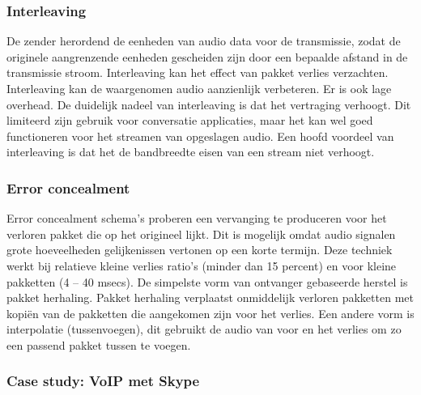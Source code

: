 \subsubsection{Interleaving}

De zender herordend de eenheden van audio data voor de transmissie, zodat de originele aangrenzende eenheden gescheiden zijn door een bepaalde afstand in de transmissie stroom. Interleaving kan het effect van pakket verlies verzachten. Interleaving kan de waargenomen audio aanzienlijk verbeteren. Er is ook lage overhead. De duidelijk nadeel van interleaving is dat het vertraging verhoogt. Dit limiteerd zijn gebruik voor conversatie applicaties, maar het kan wel goed functioneren voor het streamen van opgeslagen audio. Een hoofd voordeel van interleaving is dat het de bandbreedte eisen van een stream niet verhoogt.

\subsubsection{Error concealment}

Error concealment schema’s proberen een vervanging te produceren voor het verloren pakket die op het origineel lijkt. Dit is mogelijk omdat audio signalen grote hoeveelheden gelijkenissen vertonen op een korte termijn. Deze techniek werkt bij relatieve kleine verlies ratio’s (minder dan 15 percent) en voor kleine pakketten (4 – 40 msecs). De simpelste vorm van ontvanger gebaseerde herstel is pakket herhaling. Pakket herhaling verplaatst onmiddelijk verloren pakketten met kopiën van de pakketten die aangekomen zijn voor het verlies. Een andere vorm is interpolatie (tussenvoegen), dit gebruikt de audio van voor en het verlies om zo een passend pakket tussen te voegen.

\subsubsection{Case study: VoIP met Skype}

